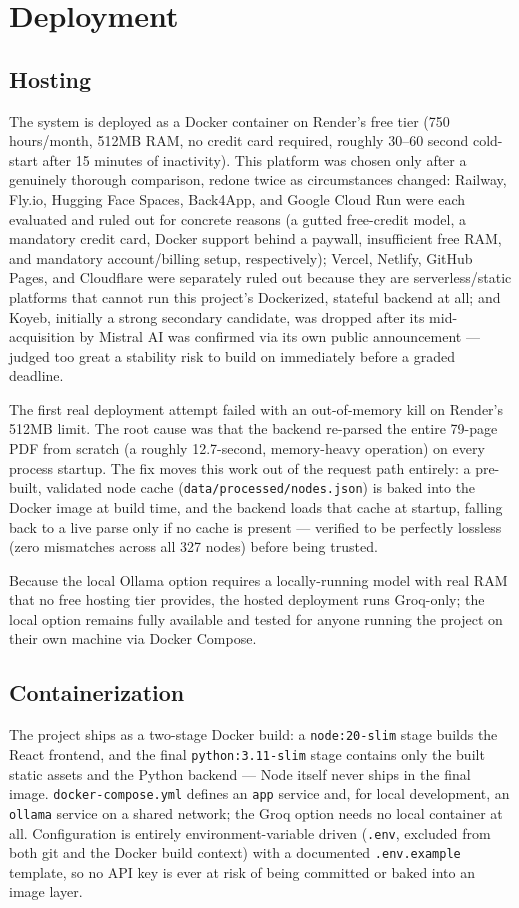 \chapter{Deployment}
\label{ch:deployment}
\section{Hosting}
The system is deployed as a Docker container on Render's free tier (750 hours/month, 512MB RAM, no credit card required, roughly 30–60 second cold-start after 15 minutes of inactivity). This platform was chosen only after a genuinely thorough comparison, redone twice as circumstances changed: Railway, Fly.io, Hugging Face Spaces, Back4App, and Google Cloud Run were each evaluated and ruled out for concrete reasons (a gutted free-credit model, a mandatory credit card, Docker support behind a paywall, insufficient free RAM, and mandatory account/billing setup, respectively); Vercel, Netlify, GitHub Pages, and Cloudflare were separately ruled out because they are serverless/static platforms that cannot run this project's Dockerized, stateful backend at all; and Koyeb, initially a strong secondary candidate, was dropped after its mid-acquisition by Mistral AI was confirmed via its own public announcement — judged too great a stability risk to build on immediately before a graded deadline.

The first real deployment attempt failed with an out-of-memory kill on Render's 512MB limit. The root cause was that the backend re-parsed the entire 79-page PDF from scratch (a roughly 12.7-second, memory-heavy operation) on every process startup. The fix moves this work out of the request path entirely: a pre-built, validated node cache (\texttt{data/\allowbreak{}processed/\allowbreak{}nodes.json}) is baked into the Docker image at build time, and the backend loads that cache at startup, falling back to a live parse only if no cache is present — verified to be perfectly lossless (zero mismatches across all 327 nodes) before being trusted.

Because the local Ollama option requires a locally-running model with real RAM that no free hosting tier provides, the hosted deployment runs Groq-only; the local option remains fully available and tested for anyone running the project on their own machine via Docker Compose.

\section{Containerization}
The project ships as a two-stage Docker build: a \texttt{node:20-slim} stage builds the React frontend, and the final \texttt{python:3.11-slim} stage contains only the built static assets and the Python backend — Node itself never ships in the final image. \texttt{docker-compose.yml} defines an \texttt{app} service and, for local development, an \texttt{ollama} service on a shared network; the Groq option needs no local container at all. Configuration is entirely environment-variable driven (\texttt{.env}, excluded from both git and the Docker build context) with a documented \texttt{.env.example} template, so no API key is ever at risk of being committed or baked into an image layer.

